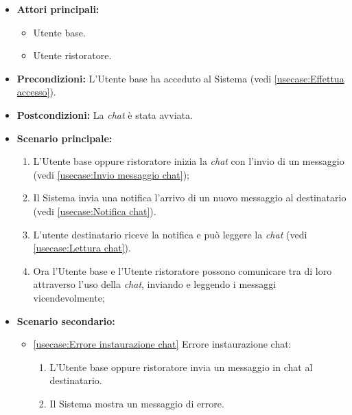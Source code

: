 \label{usecase:Chat Utente base}
\begin{itemize}
	\item \textbf{Attori principali:} 
	\begin{itemize}
        \item Utente base.
        \item Utente ristoratore.
    \end{itemize}

	\item \textbf{Precondizioni:} L'Utente base ha acceduto al Sistema (vedi \autoref{usecase:Effettua accesso}).


	\item \textbf{Postcondizioni:} La \textit{chat} è stata avviata.

	\item \textbf{Scenario principale:}
            \begin{enumerate}
                \item L'Utente base oppure ristoratore inizia la \textit{chat} con l'invio di un messaggio (vedi \autoref{usecase:Invio messaggio chat});
                \item Il Sistema invia una notifica l'arrivo di un nuovo messaggio al destinatario (vedi \autoref{usecase:Notifica chat}).
                \item L'utente destinatario riceve la notifica e può leggere la \textit{chat} (vedi \autoref{usecase:Lettura chat}).
                \item Ora l'Utente base e l'Utente ristoratore possono comunicare tra di loro attraverso l'uso della \textit{chat}, inviando e leggendo i messaggi vicendevolmente;
	      \end{enumerate}

    \item \textbf{Scenario secondario:}
		  \begin{itemize}
			  \item \autoref{usecase:Errore instaurazione chat} Errore instaurazione chat:
				\begin{enumerate}
					\item L'Utente base oppure ristoratore invia un messaggio in chat al destinatario.
					\item Il Sistema mostra un messaggio di errore.
				\end{enumerate}
		  \end{itemize}
\end{itemize}